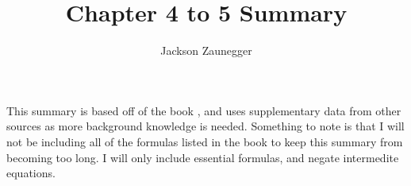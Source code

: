 \documentclass[12pt]{article}
\begin{document}
\title{Chapter 4 to 5 Summary}
\author{Jackson Zaunegger}
\date{}
\maketitle

\pagebreak
This summary is based off of the book \cite{BRA}, and uses supplementary data from other sources as more background knowledge is needed. Something to note is that I will not be including all of the formulas listed in the book to keep this summary from becoming too long. I will only include essential formulas, and negate intermedite equations. 
\tableofcontents

\pagebreak
\end{document}
